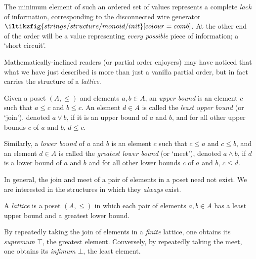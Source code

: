 The minimum element of such an ordered set of values represents a complete
\emph{lack} of information, corresponding to the disconnected wire generator \(
\iltikzfig{strings/structure/monoid/init}[colour=comb]
\).
At the other end of the order will be a value representing \emph{every possible}
piece of information; a `short circuit'.

Mathematically-inclined readers (or partial order enjoyers) may have noticed
that what we have just described is more than just a vanilla partial order, but
in fact carries the structure of a \emph{lattice}.

\begin{definition}
    Given a poset \((A, \leq)\) and elements \(a, b\in A\), an
    \emph{upper bound} is an element \(c\) such that \(a \leq c\) and
    \(b \leq c\).
    An element \(d \in A\) is called the \emph{least upper bound} (or `join'),
    denoted \(a \vee b\), if it is an upper bound of \(a\) and \(b\), and for
    all other upper bounds \(c\) of \(a\) and \(b\), \(d \leq c\).

    Similarly, a \emph{lower bound} of \(a\) and \(b\) is an element \(c\) such
    that \(c \leq a\) and \(c \leq b\), and an element \(d \in A\) is called the
    \emph{greatest lower bound} (or `meet'), denoted \(a \wedge b\), if \(d\) is
    a lower bound of \(a\) and \(b\) and for all other lower bounds \(c\) of
    \(a\) and \(b\), \(c \leq d\).
\end{definition}

In general, the join and meet of a pair of elements in a poset need not exist.
We are interested in the structures in which they \emph{always} exist.

\begin{definition}[Lattice]
    A \emph{lattice} is a poset \((A, \leq)\) in which each pair of elements
    \(a,b \in A\) has a least upper bound and a greatest lower bound.
\end{definition}

By repeatedly taking the join of elements in a \emph{finite} lattice, one
obtains its \emph{supremum} \(\top\), the greatest element.
Conversely, by repeatedly taking the meet, one obtains its \emph{infimum}
\(\bot\), the least element.

